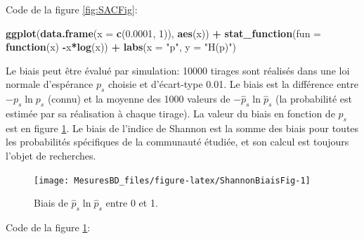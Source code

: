 \documentclass[
  11pt,
  french,
  a4paper,
  extrafontsizes,onecolumn,openright
  ]{memoir}
\newenvironment{Shaded}{\begin{snugshade}}{\end{snugshade}}
\newcommand{\AttributeTok}[1]{\textcolor[rgb]{0.13,0.29,0.53}{#1}}
\newcommand{\ControlFlowTok}[1]{\textcolor[rgb]{0.13,0.29,0.53}{\textbf{#1}}}
\newcommand{\DecValTok}[1]{\textcolor[rgb]{0.00,0.00,0.81}{#1}}
\newcommand{\FloatTok}[1]{\textcolor[rgb]{0.00,0.00,0.81}{#1}}
\newcommand{\FunctionTok}[1]{\textcolor[rgb]{0.13,0.29,0.53}{\textbf{#1}}}
\newcommand{\NormalTok}[1]{#1}
\newcommand{\SpecialCharTok}[1]{\textcolor[rgb]{0.81,0.36,0.00}{\textbf{#1}}}
\newcommand{\StringTok}[1]{\textcolor[rgb]{0.31,0.60,0.02}{#1}}
\begin{document}
\normalsize

Code de la figure \ref{fig:SACFig}:

\scriptsize

\begin{Shaded}
\begin{Highlighting}[]
\FunctionTok{ggplot}\NormalTok{(}\FunctionTok{data.frame}\NormalTok{(}\AttributeTok{x =} \FunctionTok{c}\NormalTok{(}\FloatTok{0.0001}\NormalTok{, }\DecValTok{1}\NormalTok{)), }\FunctionTok{aes}\NormalTok{(x)) }\SpecialCharTok{+} 
    \FunctionTok{stat\_function}\NormalTok{(}\AttributeTok{fun =} \ControlFlowTok{function}\NormalTok{(x) }\SpecialCharTok{{-}}\NormalTok{x}\SpecialCharTok{*}\FunctionTok{log}\NormalTok{(x)) }\SpecialCharTok{+}
    \FunctionTok{labs}\NormalTok{(}\AttributeTok{x =} \StringTok{"p"}\NormalTok{, }\AttributeTok{y =} \StringTok{"H(p)"}\NormalTok{)}
\end{Highlighting}
\end{Shaded}

\normalsize

Le biais peut être évalué par simulation: 10000 tirages sont réalisés dans une loi normale d'espérance \(p_s\) choisie et d'écart-type 0.01.
Le biais est la différence entre \({-p}_s{\ln  p_s}\) (connu) et la moyenne des 1000 valeurs de \(-\hat{p}_s{\ln{\hat{p}}_s}\) (la probabilité est estimée par sa réalisation à chaque tirage).
La valeur du biais en fonction de \(p_s\) est en figure \ref{fig:ShannonBiaisFig}.
Le biais de l'indice de Shannon est la somme des biais pour toutes les probabilités spécifiques de la communauté étudiée, et son calcul est toujours l'objet de recherches.



\scriptsize

\begin{figure}

{\centering \texttt{[image: MesuresBD\_files/figure-latex/ShannonBiaisFig-1]} 

}

\caption{Biais de \(\hat{p}_s \ln\hat{p}_s\) entre 0 et 1.}\label{fig:ShannonBiaisFig}
\end{figure}

\normalsize

Code de la figure \ref{fig:ShannonBiaisFig}:

\scriptsize
\end{document}
